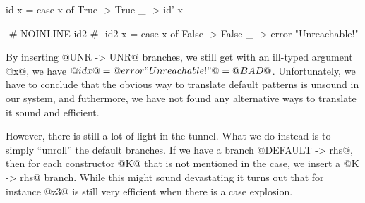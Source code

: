 \begin{code}
    id x = case x of
        True -> True
        _    -> id' x

    {-# NOINLINE id2 #-}
    id2 x = case x of
        False -> False
        _     -> error "Unreachable!"
\end{code}

By inserting @UNR -> UNR@ branches, we still get with an ill-typed
argument @x@, we have $@id x@ = @error "Unreachable!"@ = @BAD@$.
Unfortunately, we have to conclude that the obvious way to translate
default patterns is unsound in our system, and futhermore, we have not
found any alternative ways to translate it sound and efficient.

However, there is still a lot of light in the tunnel. What we do
instead is to simply ``unroll'' the default branches.  If we have a
branch @DEFAULT -> rhs@, then for each constructor @K@ that is not
mentioned in the case, we insert a @K -> rhs@ branch. While this might
sound devastating it turns out that for instance @z3@ is still very
efficient when there is a case explosion.






